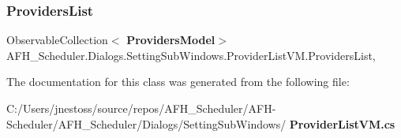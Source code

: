 \subsubsection{ProvidersList}
{\footnotesize\ttfamily Observable\+Collection$<$\textbf{ Providers\+Model}$>$ A\+F\+H\+\_\+\+Scheduler.\+Dialogs.\+Setting\+Sub\+Windows.\+Provider\+List\+V\+M.\+Providers\+List\hspace{0.3cm}{\ttfamily [get]}, {\ttfamily [set]}}



The documentation for this class was generated from the following file\+:\begin{DoxyCompactItemize}
\item 
C\+:/\+Users/jnestoss/source/repos/\+A\+F\+H\+\_\+\+Scheduler/\+A\+F\+H-\/\+Scheduler/\+A\+F\+H\+\_\+\+Scheduler/\+Dialogs/\+Setting\+Sub\+Windows/\textbf{ Provider\+List\+V\+M.\+cs}\end{DoxyCompactItemize}
